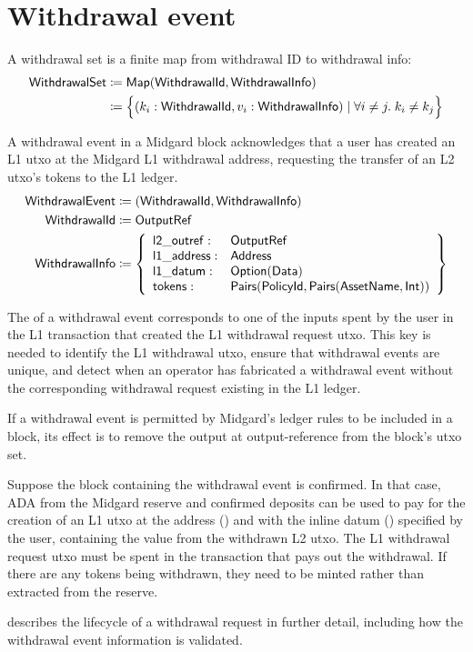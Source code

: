 \documentclass[../midgard.tex]{subfiles}
\begin{document}
\section{Withdrawal event}
\label{h:withdrawal-event}

A withdrawal set is a finite map from withdrawal ID to withdrawal info:
\begin{align*}
    \mathsf{WithdrawalSet} &\coloneq \mathsf{Map(WithdrawalId, WithdrawalInfo)} \\
      &\coloneq \Bigl\{
        (k_i: \mathsf{WithdrawalId}, v_i: \mathsf{WithdrawalInfo}) \mid \forall i \neq j.\; k_i \neq k_j
    \Bigr\}
\end{align*}

A withdrawal event in a Midgard block acknowledges that a user has created an L1 utxo at the Midgard L1 withdrawal address, requesting the transfer of an L2 utxo's tokens to the L1 ledger.
\begin{align*}
    \mathsf{WithdrawalEvent} &\coloneq \mathsf{(WithdrawalId, WithdrawalInfo)} \\
    \mathsf{WithdrawalId} &\coloneq \mathsf{OutputRef} \\
    \mathsf{WithdrawalInfo} &\coloneq \left\{
        \begin{array}{ll}
            \mathsf{l2\_outref} :& \mathsf{OutputRef} \\
            \mathsf{l1\_address} : & \mathsf{Address} \\
            \mathsf{l1\_datum} : & \mathsf{Option(Data)} \\
            \mathsf{tokens} : & \mathsf{Pairs(PolicyId, Pairs(AssetName, Int))}
        \end{array} \right\}
\end{align*}

The  of a withdrawal event corresponds to one of the inputs spent by the user in the L1 transaction that created the L1 withdrawal request utxo.
This key is needed to identify the L1 withdrawal utxo, ensure that withdrawal events are unique, and detect when an operator has fabricated a withdrawal event without the corresponding withdrawal request existing in the L1 ledger.

If a withdrawal event is permitted by Midgard's ledger rules to be included in a block, its effect is to remove the output at output-reference  from the block's utxo set.

Suppose the block containing the withdrawal event is confirmed.
In that case, ADA from the Midgard reserve and confirmed deposits can be used to pay for the creation of an L1 utxo at the address () and with the inline datum () specified by the user, containing the value from the withdrawn L2 utxo.
The L1 withdrawal request utxo must be spent in the transaction that pays out the withdrawal. If there are any tokens being withdrawn, they need to be minted rather than extracted from the reserve.

 describes the lifecycle of a withdrawal request in further detail, including how the withdrawal event information is validated.
\end{document}
